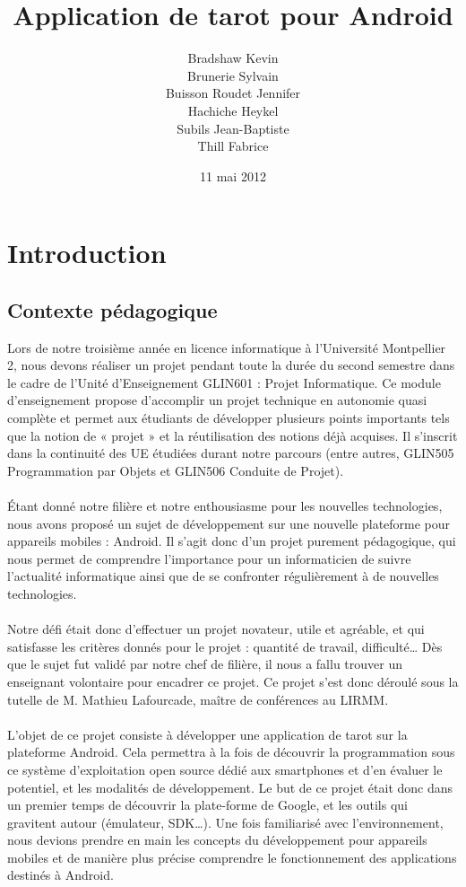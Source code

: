 \documentclass[a4paper]{report}
\title{\huge{Application de tarot pour Android}}
\author{Bradshaw Kevin\\
Brunerie Sylvain\\
Buisson Roudet Jennifer\\
Hachiche Heykel\\ 
Subils Jean-Baptiste\\ 
Thill Fabrice}
\date{11 mai 2012}
\begin{document}
\maketitle


\tableofcontents





\chapter{Introduction}
	\section{Contexte pédagogique}
		Lors de notre troisième année en licence informatique à l’Université Montpellier 2, nous devons réaliser un projet pendant toute la durée du second semestre dans le cadre de l’Unité 			d’Enseignement GLIN601 : Projet Informatique. Ce module d’enseignement propose d’accomplir un projet technique en autonomie quasi complète et permet aux étudiants de développer 			plusieurs points importants tels que la notion de « projet » et la réutilisation des notions déjà acquises. Il s’inscrit dans la continuité des UE étudiées durant notre parcours 			(entre autres, GLIN505 Programmation par Objets et GLIN506 Conduite de Projet).\\
		\\ 

		Étant donné notre filière et notre enthousiasme pour les nouvelles technologies, nous avons proposé un sujet de développement sur une nouvelle plateforme pour appareils mobiles : Android. Il 			s’agit donc d’un projet purement pédagogique, qui nous permet de comprendre l’importance pour un informaticien de suivre l’actualité informatique ainsi que de se confronter 			régulièrement à de nouvelles technologies.\\
		\\ 
		Notre défi était donc d’effectuer un projet novateur, utile et agréable, et qui satisfasse les critères donnés pour le projet : quantité de travail, difficulté… Dès que le sujet fut 			validé par notre chef de filière, il nous a fallu trouver un enseignant volontaire pour encadrer ce projet. Ce projet s’est donc déroulé sous la tutelle de M. Mathieu Lafourcade, maître 			de conférences au LIRMM.\\
		\\  
		L’objet de ce projet consiste à développer une application de tarot sur la plateforme Android. Cela permettra à la fois de découvrir la programmation sous ce système d’exploitation open 			source dédié aux smartphones et d’en évaluer le potentiel, et les modalités de développement. Le but de ce projet était donc dans un premier temps de découvrir la plate-forme de Google, et les outils qui gravitent 			autour (émulateur, SDK…). Une fois familiarisé avec l’environnement, nous devions prendre en main les concepts du développement pour appareils mobiles et de manière plus précise 			comprendre le fonctionnement des applications destinés à Android.\\
\end{document}

